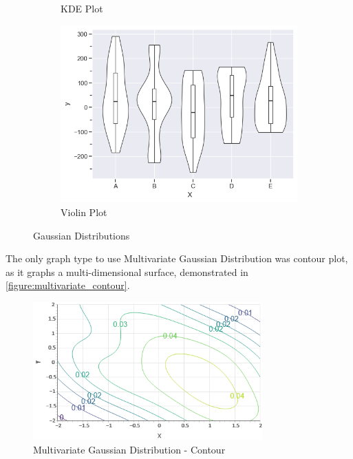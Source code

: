 \begin{figure}
\begin{subfigure}[b]{0.29\textwidth}
        \caption{KDE Plot}
        \label{figure:kdplot}
    \end{subfigure}
    \begin{subfigure}[b]{0.29\textwidth}
        \centering
        \includegraphics[width=\textwidth]{figures/body/methodology/norm_violin.png}
        \caption{Violin Plot}
        \label{figure:norm_violin}
    \end{subfigure}
    \caption{Gaussian Distributions}
    \label{figure:normal_distribution}
\end{figure}

The only graph type to use Multivariate Gaussian Distribution was contour plot, as it graphs a multi-dimensional surface, demonstrated in \autoref{figure:multivariate_contour}.

\hfill

\begin{figure}[hbt]
    \centering
    \includegraphics[width=250pt,keepaspectratio]{figures/body/methodology/multi_contour.png}
    \caption{Multivariate Gaussian Distribution - Contour}
    \label{figure:multivariate_contour}
\end{figure}

